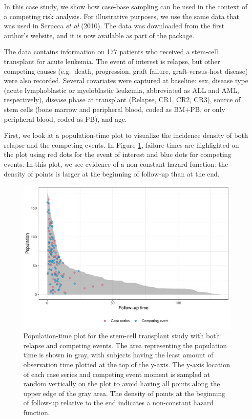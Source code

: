 In this case study, we show how case-base sampling can be used in the context of a competing risk analysis. For illustrative purposes, we use the same data that was used in Scrucca \emph{et al} (2010). The data was downloaded from the first author's website, and it is now available as part of the  package.

The data contains information on 177 patients who received a stem-cell transplant for acute leukemia. The event of interest is relapse, but other competing causes (e.g.~death, progression, graft failure, graft-versus-host disease) were also recorded. Several covariates were captured at baseline: sex, disease type (acute lymphoblastic or myeloblastic leukemia, abbreviated as ALL and AML, respectively), disease phase at transplant (Relapse, CR1, CR2, CR3), source of stem cells (bone marrow and peripheral blood, coded as BM+PB, or only peripheral blood, coded as PB), and age.

First, we look at a population-time plot to visualize the incidence density of both relapse and the competing events. In Figure \ref{fig:compPop}, failure times are highlighted on the plot using red dots for the event of interest and blue dots for competing events. In this plot, we see evidence of a non-constant hazard function: the density of points is larger at the beginning of follow-up than at the end.

\begin{figure}[ht]
\includegraphics[width=\textwidth,keepaspectratio=true]{./compPop-1} \caption{Population-time plot for the stem-cell transplant study with both relapse and competing events. The area representing the population time is shown in gray, with subjects having the least amount of observation time plotted at the top of the y-axis. The y-axis location of each case series and competing event moment is sampled at random vertically on the plot to avoid having all points along the upper edge of the gray area. The density of points at the beginning of follow-up relative to the end indicates a non-constant hazard function.}\label{fig:compPop}
\end{figure}

